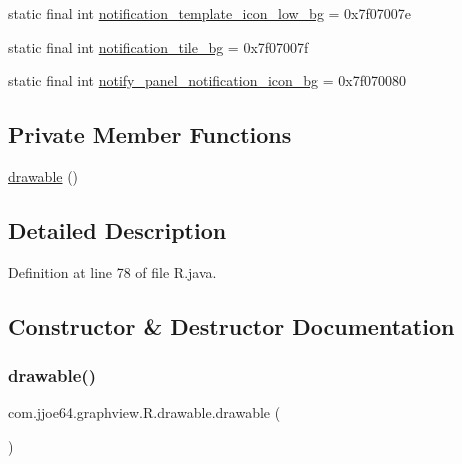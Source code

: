 \begin{DoxyCompactItemize}
\item 
static final int \mbox{\hyperlink{classcom_1_1jjoe64_1_1graphview_1_1_r_1_1drawable_a695e981d0ca586f4b19443e416da8f5d}{notification\+\_\+template\+\_\+icon\+\_\+low\+\_\+bg}} = 0x7f07007e
\item 
static final int \mbox{\hyperlink{classcom_1_1jjoe64_1_1graphview_1_1_r_1_1drawable_a1a7e77810cb6cf6c149d3fd56153c240}{notification\+\_\+tile\+\_\+bg}} = 0x7f07007f
\item 
static final int \mbox{\hyperlink{classcom_1_1jjoe64_1_1graphview_1_1_r_1_1drawable_a6717bfdb0e1cb8bc4d33a72cf8b68b6e}{notify\+\_\+panel\+\_\+notification\+\_\+icon\+\_\+bg}} = 0x7f070080
\end{DoxyCompactItemize}
\subsection*{Private Member Functions}
\begin{DoxyCompactItemize}
\item 
\mbox{\hyperlink{classcom_1_1jjoe64_1_1graphview_1_1_r_1_1drawable_aceb9665eb7b2eefbdb7de2364c57cf36}{drawable}} ()
\end{DoxyCompactItemize}


\subsection{Detailed Description}


Definition at line 78 of file R.\+java.



\subsection{Constructor \& Destructor Documentation}
\mbox{\label{classcom_1_1jjoe64_1_1graphview_1_1_r_1_1drawable_aceb9665eb7b2eefbdb7de2364c57cf36}} 
\subsubsection{\texorpdfstring{drawable()}{drawable()}}
{\footnotesize\ttfamily com.\+jjoe64.\+graphview.\+R.\+drawable.\+drawable (\begin{DoxyParamCaption}{ }\end{DoxyParamCaption})\hspace{0.3cm}{\ttfamily [private]}}



